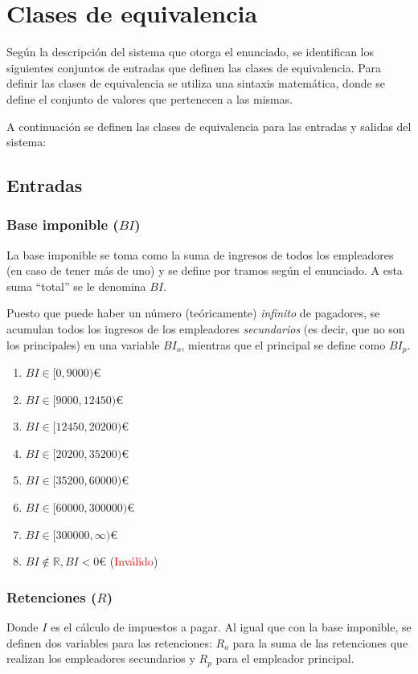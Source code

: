 \chapter{Clases de equivalencia}
Según la descripción del sistema que otorga el enunciado, se identifican los siguientes conjuntos de entradas
que definen las clases de equivalencia. Para definir las clases de equivalencia se utiliza una sintaxis
matemática, donde se define el conjunto de valores que pertenecen a las mismas.

A continuación se definen las clases de equivalencia para las entradas y salidas del sistema:

\section{Entradas}
\subsection{Base imponible ($BI$)}
La base imponible se toma como la suma de ingresos de todos los empleadores
(en caso de tener más de uno) y se define por tramos según el enunciado.
A esta suma ``total'' se le denomina $BI$.

Puesto que puede haber un número (teóricamente) \textit{infinito} de pagadores,
se acumulan todos los ingresos de los empleadores \textit{secundarios} (es decir, que no
son los principales) en una variable $BI_{o}$, mientras que el principal se define como $BI_{p}$.

\begin{enumerate}
	\item $BI \in [0, 9000)$€
	\item $BI \in [9000, 12450)$€
	\item $BI \in [12450, 20200)$€
	\item $BI \in [20200, 35200)$€
	\item $BI \in [35200, 60000)$€
	\item $BI \in [60000, 300000)$€
	\item $BI \in [300000, \infty)$€
	\item $BI \notin \mathbb{R}, BI < 0$€ (\textcolor{red}{Inválido})
\end{enumerate}


\subsection{Retenciones ($R$)}
Donde $I$ es el cálculo de impuestos a pagar. Al igual que con la base imponible, se definen
dos variables para las retenciones: $R_{o}$ para la suma de las retenciones que realizan los
empleadores secundarios y $R_{p}$ para el empleador principal.

